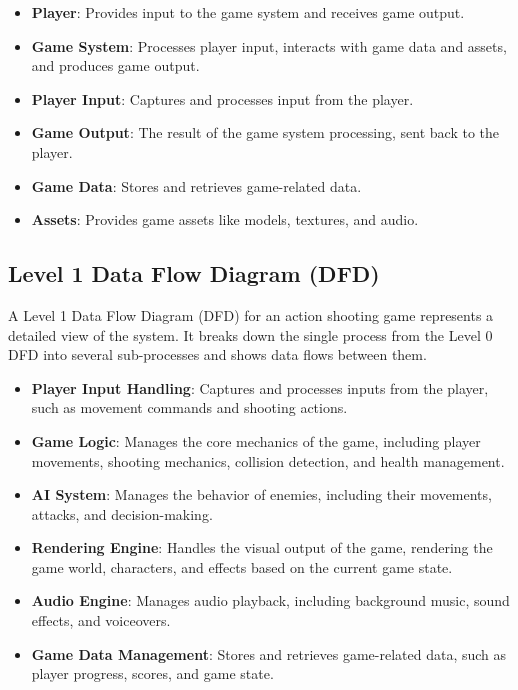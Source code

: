 \begin{itemize}
	\item \textbf{Player}: Provides input to the game system and receives game output.
	\item \textbf{Game System}: Processes player input, interacts with game data and assets, and produces game output.
	\item \textbf{Player Input}: Captures and processes input from the player.
	\item \textbf{Game Output}: The result of the game system processing, sent back to the player.
	\item \textbf{Game Data}: Stores and retrieves game-related data.
	\item \textbf{Assets}: Provides game assets like models, textures, and audio.
\end{itemize}

\subsection{Level 1 Data Flow Diagram (DFD)}
A Level 1 Data Flow Diagram (DFD) for an action shooting game represents a detailed view of the system. It breaks down the single process from the Level 0 DFD into several sub-processes and shows data flows between them.
\begin{itemize}
	\item \textbf{Player Input Handling}: Captures and processes inputs from the player, such as movement commands and shooting actions.
	\item \textbf{Game Logic}: Manages the core mechanics of the game, including player movements, shooting mechanics, collision detection, and health management.
	\item \textbf{AI System}: Manages the behavior of enemies, including their movements, attacks, and decision-making.
	\item \textbf{Rendering Engine}: Handles the visual output of the game, rendering the game world, characters, and effects based on the current game state.
	\item \textbf{Audio Engine}: Manages audio playback, including background music, sound effects, and voiceovers.
	\item \textbf{Game Data Management}: Stores and retrieves game-related data, such as player progress, scores, and game state.
\end{itemize}

